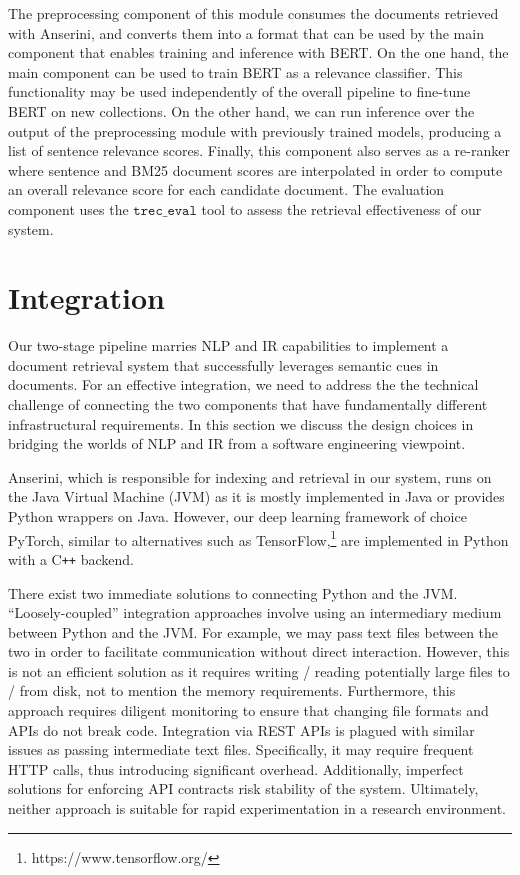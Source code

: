 The preprocessing component of this module consumes the documents retrieved with Anserini, and converts them into a format that can be used by the main component that enables training and inference with BERT.
On the one hand, the main component can be used to train BERT as a relevance classifier.
This functionality may be used independently of the overall pipeline to fine-tune BERT on new collections.
On the other hand, we can run inference over the output of the preprocessing module with previously trained models, producing a list of sentence relevance scores.
Finally, this component also serves as a re-ranker where sentence and BM25 document scores are interpolated in order to compute an overall relevance score for each candidate document.
The evaluation component uses the $\texttt{trec\_eval}$ tool to assess the retrieval effectiveness of our system.

\section{Integration}

Our two-stage pipeline marries NLP and IR capabilities to implement a document retrieval system that successfully leverages semantic cues in documents.
For an effective integration, we need to address the the technical challenge of connecting the two components that have fundamentally different infrastructural requirements.
In this section we discuss the design choices in bridging the worlds of NLP and IR from a software engineering viewpoint.

Anserini, which is responsible for indexing and retrieval in our system, runs on the Java Virtual Machine (JVM) as it is mostly implemented in Java or provides Python wrappers on Java.
However, our deep learning framework of choice PyTorch, similar to alternatives such as TensorFlow,\footnote{https://www.tensorflow.org/} are implemented in Python with a C\texttt{++} backend.

There exist two immediate solutions to connecting Python and the JVM.
``Loosely-coupled'' integration approaches involve using an intermediary medium between Python and the JVM.
For example, we may pass text files between the two in order to facilitate communication without direct interaction.
However, this is not an efficient solution as it requires writing / reading potentially large files to / from disk, not to mention the memory requirements.
Furthermore, this approach requires diligent monitoring to ensure that changing file formats and APIs do not break code.
Integration via REST APIs is plagued with similar issues as passing intermediate text files.
Specifically, it may require frequent HTTP calls, thus introducing significant overhead.
Additionally, imperfect solutions for enforcing API contracts risk stability of the system.
Ultimately, neither approach is suitable for rapid experimentation in a research environment.


